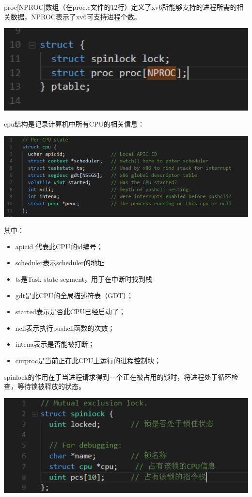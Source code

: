 proc[NPROC]数组（在proc.c文件的12行）定义了xv6所能够支持的进程所需的相关数据，NPROC表示了xv6可支持进程个数。

\includegraphics[width=6in]{figures/process/fig4.png}

cpu结构是记录计算机中所有CPU的相关信息：

\includegraphics[width=6in]{figures/process/fig5.png}

其中：

\begin{itemize}
\item apicid 代表此CPU的id编号；
\item scheduler表示scheduler的地址
\item ts是Task state segment，用于在中断时找到栈
\item gdt是此CPU的全局描述符表（GDT）；
\item started表示是否此CPU已经启动了；
\item ncli表示执行pushcli函数的次数；
\item intena表示是否能被打断；
\item curproc是当前正在此CPU上运行的进程控制块；
\end{itemize}

spinlock的作用在于当进程请求得到一个正在被占用的锁时，将进程处于循环检查，等待锁被释放的状态。

\includegraphics[width=6in]{figures/process/fig6.png}

